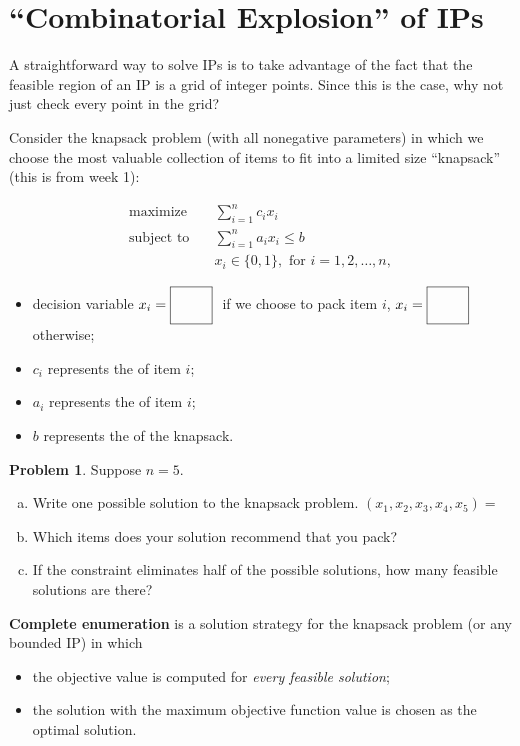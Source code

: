 \documentclass[11pt]{article}
\theoremstyle{definition}
\newtheorem{problem}{Problem}
\newcommand{\answerbox}[3]{%
  \fbox{%
    \begin{minipage}[#1]{#2}
      \hfill\vspace{#3}
    \end{minipage}
  }
}
\newcommand{\wordbox}{\answerbox{c}{1.2in}{.7cm}}
\newcommand{\letterbox}{\answerbox{c}{.7cm}{.7cm}}
\newcommand{\maximize}{\text{maximize}}
\newcommand{\subjectto}{\text{subject to}}
\begin{document}
\section{``Combinatorial Explosion'' of IPs}
A straightforward way to solve IPs is to take advantage of the fact that the feasible region of an IP is a grid of integer points. Since this is the case, why not just check every point in the grid? \bigskip


Consider the knapsack problem (with all nonegative parameters) in which we choose the most valuable collection of items to fit into a limited size ``knapsack'' (this is from week 1):

    \begin{align*}
      \maximize \quad & \sum_{i=1}^n c_i x_i \\
      \subjectto \quad & \sum_{i=1}^n a_i x_i \leq b \\
                       & x_i \in \{0,1\}, \text{ for } i = 1, 2,\dots,n,
    \end{align*}
\begin{itemize}
\item decision variable $x_i = \letterbox~$ if we choose to pack item $i$, $x_i = \letterbox$ otherwise;
\item $c_i$ represents the \wordbox of item $i$;
\item $a_i$ represents the \wordbox of item $i$;
\item $b$ represents the \wordbox of the knapsack.
\end{itemize}

\bigskip
\begin{problem}
Suppose $n = 5$.  
\begin{enumerate}[(a)]
\item Write one possible solution to the knapsack problem. $(x_1, x_2, x_3, x_4, x_5) =$ \wordbox
\item Which items does your solution recommend that you pack?  \vspace{2cm}



\item If the constraint eliminates half of the possible solutions, how many feasible solutions are there?  

\vfill
\end{enumerate}
\end{problem}

\newpage

\begin{tcolorbox}
\textbf{Complete enumeration} is a solution strategy for the knapsack problem (or any bounded IP) in which 
\begin{itemize}
\item the objective value is computed for \emph{every feasible solution};
\item the solution with the maximum objective function value is chosen as the optimal solution.
\end{itemize}
\end{tcolorbox}
\end{document}
